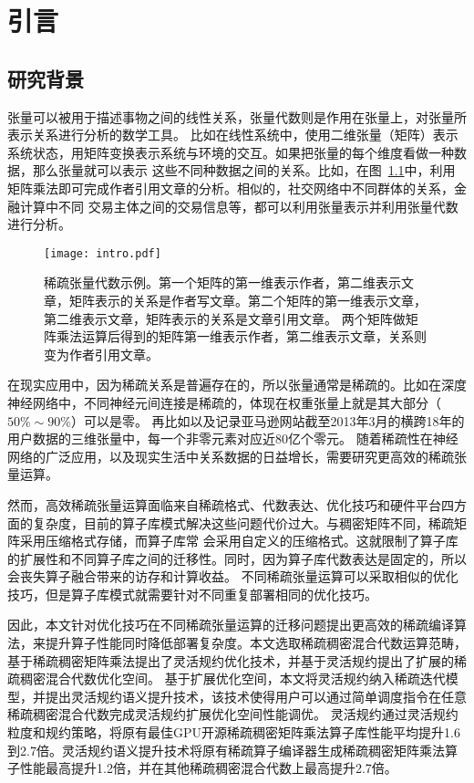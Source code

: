 
\chapter{引言}

\section{研究背景}
张量可以被用于描述事物之间的线性关系，张量代数则是作用在张量上，对张量所表示关系进行分析的数学工具。
比如在线性系统中，使用二维张量（矩阵）表示系统状态，用矩阵变换表示系统与环境的交互。如果把张量的每个维度看做一种数据，那么张量就可以表示
这些不同种数据之间的关系。比如，在图~\ref{fig:intro}中，利用矩阵乘法即可完成作者引用文章的分析。相似的，社交网络中不同群体的关系，金融计算中不同
交易主体之间的交易信息等，都可以利用张量表示并利用张量代数进行分析。
\begin{figure}
  \centering
  \texttt{[image: intro.pdf]}
  \caption{稀疏张量代数示例。第一个矩阵的第一维表示作者，第二维表示文章，矩阵表示的关系是作者写文章。第二个矩阵的第一维表示文章，第二维表示文章，矩阵表示的关系是文章引用文章。
  两个矩阵做矩阵乘法运算后得到的矩阵第一维表示作者，第二维表示文章，关系则变为作者引用文章。}
  \label{fig:intro}
\end{figure}

在现实应用中，因为稀疏关系是普遍存在的\cite{uzzi2007small}，所以张量通常是稀疏的。比如在深度神经网络中，不同神经元间连接是稀疏的，体现在权重张量上就是其大部分（$50\% \sim 90\%$）可以是零\cite{wang2021dual}。
再比如以及记录亚马逊网站截至2013年3月的横跨18年的用户数据的三维张量中，每一个非零元素对应近80亿个零元\cite{mcauley2013hidden}。
随着稀疏性在神经网络的广泛应用\cite{xiao2022smoothquant}，以及现实生活中关系数据的日益增长，需要研究更高效的稀疏张量运算。

然而，高效稀疏张量运算面临来自稀疏格式、代数表达、优化技巧和硬件平台四方面的复杂度\cite{kjolstad:2020:phd-thesis}，目前的算子库模式解决这些问题代价过大。与稠密矩阵不同，稀疏矩阵采用压缩格式存储，而算子库常
会采用自定义的压缩格式。这就限制了算子库的扩展性和不同算子库之间的迁移性。同时，因为算子库代数表达是固定的，所以会丧失算子融合带来的访存和计算收益。
不同稀疏张量运算可以采取相似的优化技巧，但是算子库模式就需要针对不同重复部署相同的优化技巧。

因此，本文针对优化技巧在不同稀疏张量运算的迁移问题提出更高效的稀疏编译算法，来提升算子性能同时降低部署复杂度。本文选取稀疏稠密混合代数运算范畴，基于稀疏稠密矩阵乘法提出了灵活规约优化技术，并基于灵活规约提出了扩展的稀疏稠密混合代数优化空间。
基于扩展优化空间，本文将灵活规约纳入稀疏迭代模型\cite{kjolstad:2017:taco}，并提出灵活规约语义提升技术，该技术使得用户可以通过简单调度指令在任意稀疏稠密混合代数完成灵活规约扩展优化空间性能调优。
灵活规约通过灵活规约粒度和规约策略，将原有最佳GPU开源稀疏稠密矩阵乘法算子库性能平均提升1.6到2.7倍。灵活规约语义提升技术将原有稀疏算子编译器生成稀疏稠密矩阵乘法算子性能最高提升1.2倍，并在其他稀疏稠密混合代数上最高提升2.7倍。

